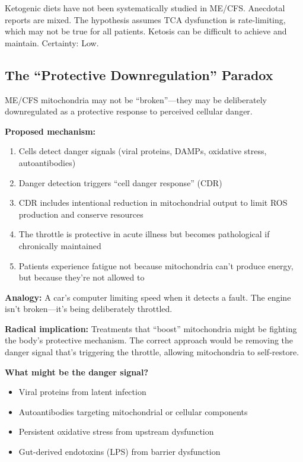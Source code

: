 \begin{warning}
Ketogenic diets have not been systematically studied in ME/CFS. Anecdotal reports are mixed. The hypothesis assumes TCA dysfunction is rate-limiting, which may not be true for all patients. Ketosis can be difficult to achieve and maintain. Certainty: Low.
\end{warning}

\subsection{The ``Protective Downregulation'' Paradox}
\label{sec:protective-downregulation}

\begin{hypothesis}
\label{hyp:protective-throttle}
ME/CFS mitochondria may not be ``broken''---they may be deliberately downregulated as a protective response to perceived cellular danger.

\textbf{Proposed mechanism:}
\begin{enumerate}
    \item Cells detect danger signals (viral proteins, DAMPs, oxidative stress, autoantibodies)
    \item Danger detection triggers ``cell danger response'' (CDR)~\cite{Naviaux2014cdr}
    \item CDR includes intentional reduction in mitochondrial output to limit ROS production and conserve resources
    \item The throttle is protective in acute illness but becomes pathological if chronically maintained
    \item Patients experience fatigue not because mitochondria can't produce energy, but because they're not allowed to
\end{enumerate}

\textbf{Analogy:} A car's computer limiting speed when it detects a fault. The engine isn't broken---it's being deliberately throttled.

\textbf{Radical implication:} Treatments that ``boost'' mitochondria might be fighting the body's protective mechanism. The correct approach would be removing the danger signal that's triggering the throttle, allowing mitochondria to self-restore.

\textbf{What might be the danger signal?}
\begin{itemize}
    \item Viral proteins from latent infection
    \item Autoantibodies targeting mitochondrial or cellular components
    \item Persistent oxidative stress from upstream dysfunction
    \item Gut-derived endotoxins (LPS) from barrier dysfunction
\end{itemize}
\end{hypothesis}

